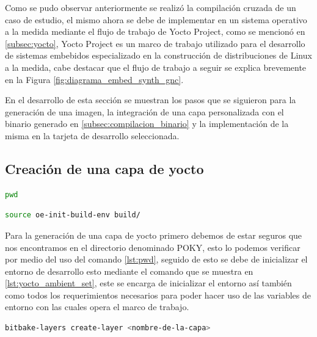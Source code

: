Como se pudo observar anteriormente se realizó la compilación cruzada de un caso de estudio, el mismo ahora se debe de implementar en un sistema operativo a la medida mediante el flujo de trabajo de Yocto Project, como se mencionó en \ref{subsec:yocto}, Yocto Project es un marco de trabajo utilizado para el desarrollo de sistemas embebidos especializado en la construcción de distribuciones de Linux a la medida, cabe destacar que el flujo de trabajo a seguir se explica brevemente en la Figura \ref{fig:diagrama_embed_synth_gnc}. 

En el desarrollo de esta sección se muestran los pasos que se siguieron para la generación de una imagen, la integración de una capa personalizada con el binario generado en \ref{subsec:compilacion_binario} y la implementación de la misma en la tarjeta de desarrollo seleccionada.

\subsection{Creación de una capa de yocto}

\begin{lstlisting}[language=bash, caption={"Print Working Directory",Linux}, label=lst:pwd]
    pwd
\end{lstlisting}

\begin{lstlisting}[language=bash, caption={Inicializar ambiente, Yocto}, label=lst:yocto_ambient_set]
    source oe-init-build-env build/
\end{lstlisting}

Para la generación de una capa de yocto primero debemos de estar seguros que nos encontramos en el directorio denominado POKY, esto lo podemos verificar por medio del uso del comando \ref{lst:pwd}, seguido de esto se debe de inicializar el entorno de desarrollo esto mediante el comando que se muestra en \ref{lst:yocto_ambient_set}, este se encarga de inicializar el entorno así también como todos los requerimientos necesarios para poder hacer uso de las variables de entorno con las cuales opera el marco de trabajo.

\begin{lstlisting}[language=bash, caption={Generar nueva capa, Yocto }, label=lst:yocto_new_layer]
    bitbake-layers create-layer <nombre-de-la-capa>
\end{lstlisting}

